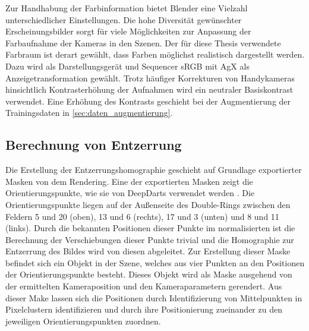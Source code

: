 Zur Handhabung der Farbinformation bietet Blender eine Vielzahl unterschiedlicher Einstellungen. Die hohe Diversität gewünschter Erscheinungsbilder sorgt für viele Möglichkeiten zur Anpassung der Farbaufnahme der Kameras in den Szenen. Der für diese Thesis verwendete Farbraum ist derart gewählt, dass Farben möglichst realistisch dargestellt werden. Dazu wird als Darstellungsgerät und Sequencer sRGB mit AgX als Anzeigetransformation gewählt. Trotz häufiger Korrekturen von Handykameras hinsichtlich Kontrasterhöhung der Aufnahmen wird ein neutraler Basiskontrast verwendet. Eine Erhöhung des Kontrasts geschieht bei der Augmentierung der Trainingsdaten in \autoref{sec:daten_augmentierung}.

\subsection{Berechnung von Entzerrung}  %
\label{sec:berechnung_entzerrung}

Die Erstellung der Entzerrungshomographie geschieht auf Grundlage exportierter Masken von dem Rendering. Eine der exportierten Masken zeigt die Orientierungspunkte, wie sie von DeepDarts verwendet werden \cite{deepdarts}. Die Orientierungspunkte liegen auf der Außenseite des Double-Rings zwischen den Feldern 5 und 20 (oben), 13 und 6 (rechts), 17 und 3 (unten) und 8 und 11 (links). Durch die bekannten Positionen dieser Punkte im normalisierten ist die Berechnung der Verschiebungen dieser Punkte trivial und die Homographie zur Entzerrung des Bildes wird von diesen abgeleitet. Zur Erstellung dieser Maske befindet sich ein Objekt in der Szene, welches aus vier Punkten an den Positionen der Orientierungspunkte besteht. Dieses Objekt wird als Maske ausgehend von der ermittelten Kameraposition und den Kameraparametern gerendert. Aus dieser Make lassen sich die Positionen durch Identifizierung von Mittelpunkten in Pixelclustern identifizieren und durch ihre Positionierung zueinander zu den jeweiligen Orientierungspunkten zuordnen.
